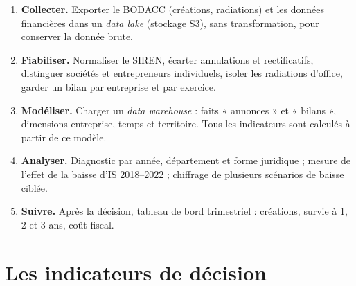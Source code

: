 \documentclass[11pt,a4paper]{article}
\begin{document}
\begin{center}
\end{center}

\begin{enumerate}[leftmargin=1.4em]
  \item \textbf{Collecter.} Exporter le BODACC (créations, radiations) et les données financières dans un
        \emph{data lake} (stockage S3), sans transformation, pour conserver la donnée brute.
  \item \textbf{Fiabiliser.} Normaliser le SIREN, écarter annulations et rectificatifs, distinguer sociétés et
        entrepreneurs individuels, isoler les radiations d'office, garder un bilan par entreprise et par exercice.
  \item \textbf{Modéliser.} Charger un \emph{data warehouse} : faits « annonces » et « bilans »,
        dimensions entreprise, temps et territoire. Tous les indicateurs sont calculés à partir de ce modèle.
  \item \textbf{Analyser.} Diagnostic par année, département et forme juridique ; mesure de l'effet de la
        baisse d'IS 2018–2022 ; chiffrage de plusieurs scénarios de baisse ciblée.
  \item \textbf{Suivre.} Après la décision, tableau de bord trimestriel : créations, survie à 1, 2 et 3 ans,
        coût fiscal.
\end{enumerate}

\section{Les indicateurs de décision}
\end{document}
